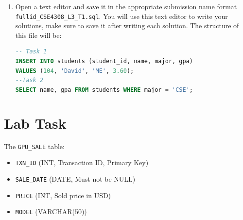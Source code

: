 \documentclass[12pt,a4paper]{article}
\begin{document}
\begin{enumerate}
After loading the SQL file, reconnect to PostgreSQL to verify that the tables have been created.

1. Reconnect to Your Database:

   \begin{lstlisting}[language=SQL]
   psql -h localhost -U student_12345 -d cse4308_12345
   \end{lstlisting}

2. Check Tables:

   Verify the tables have been created by listing them:

   \begin{lstlisting}[language=SQL]
   \dt
   \end{lstlisting}

3. View Table Data:

   Verify the data by running the following SQL queries:

   \begin{lstlisting}[language=SQL]
   SELECT * FROM <table_name>;
   \end{lstlisting}

\item Open a text editor and save it in the appropriate submission name format \\ \texttt{fullid\_CSE4308\_L3\_T1.sql}. You will use this text editor to write your solutions, make sure to save it after writing each solution. The structure of this file will be:
\begin{lstlisting}[language=SQL]
-- Task 1
INSERT INTO students (student_id, name, major, gpa)
VALUES (104, 'David', 'ME', 3.60);
--Task 2
SELECT name, gpa FROM students WHERE major = 'CSE';
\end{lstlisting}
\end{enumerate}
\newpage
\section{Lab Task}
The \texttt{GPU\_SALE} table:
\begin{itemize}
        \item \texttt{TXN\_ID} (INT, Transaction ID, Primary Key)
        \item \texttt{SALE\_DATE} (DATE, Must not be NULL)
        \item \texttt{PRICE} (INT, Sold price in USD)
        \item \texttt{MODEL} (VARCHAR(50))
\end{itemize}
\end{document}
